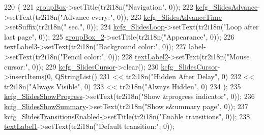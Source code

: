 \begin{DoxyCode}
220     \{
221         \hyperlink{classUi__DlgPresentationBase_a32e91831bba9e18b1bd040f092d18f7a}{groupBox}->setTitle(tr2i18n(\textcolor{stringliteral}{"Navigation"}, 0));
222         \hyperlink{classUi__DlgPresentationBase_a0c1bde315c60ff1727e7b00df3523775}{kcfg\_SlidesAdvance}->setText(tr2i18n(\textcolor{stringliteral}{"Advance every:"}, 0));
223         \hyperlink{classUi__DlgPresentationBase_aba7f1b1ba7c742636c1f2e306001cb3a}{kcfg\_SlidesAdvanceTime}->setSuffix(tr2i18n(\textcolor{stringliteral}{" sec."}, 0));
224         \hyperlink{classUi__DlgPresentationBase_a4bce7ac09466e7c37491950385741fa5}{kcfg\_SlidesLoop}->setText(tr2i18n(\textcolor{stringliteral}{"Loop after last page"}, 0));
225         \hyperlink{classUi__DlgPresentationBase_a74ff79cdf30be7fcd1d8a52488d14bbf}{groupBox\_2}->setTitle(tr2i18n(\textcolor{stringliteral}{"Appearance"}, 0));
226         \hyperlink{classUi__DlgPresentationBase_ae5ef2f22ad09c5290e989c3979c7009f}{textLabel3}->setText(tr2i18n(\textcolor{stringliteral}{"Background color:"}, 0));
227         \hyperlink{classUi__DlgPresentationBase_ae5123efd7c909bb49d9f9e1252f807e0}{label}->setText(tr2i18n(\textcolor{stringliteral}{"Pencil color:"}, 0));
228         \hyperlink{classUi__DlgPresentationBase_acbcb684cbb6019f342e3915f13e88dd7}{textLabel2}->setText(tr2i18n(\textcolor{stringliteral}{"Mouse cursor:"}, 0));
229         \hyperlink{classUi__DlgPresentationBase_a63fb3704d0688c48101de850dc997a52}{kcfg\_SlidesCursor}->clear();
230         \hyperlink{classUi__DlgPresentationBase_a63fb3704d0688c48101de850dc997a52}{kcfg\_SlidesCursor}->insertItems(0, QStringList()
231          << tr2i18n(\textcolor{stringliteral}{"Hidden After Delay"}, 0)
232          << tr2i18n(\textcolor{stringliteral}{"Always Visible"}, 0)
233          << tr2i18n(\textcolor{stringliteral}{"Always Hidden"}, 0)
234         );
235         \hyperlink{classUi__DlgPresentationBase_a49775134ab9e76d0159e100bbe9f7cc3}{kcfg\_SlidesShowProgress}->setText(tr2i18n(\textcolor{stringliteral}{"Show &progress indicator"}, 0));
236         \hyperlink{classUi__DlgPresentationBase_aaa52dec18529c711c073a72fa10ac18e}{kcfg\_SlidesShowSummary}->setText(tr2i18n(\textcolor{stringliteral}{"Show s&ummary page"}, 0));
237         \hyperlink{classUi__DlgPresentationBase_a489f5852bca9a8fa374373464e6471c5}{kcfg\_SlidesTransitionsEnabled}->setTitle(tr2i18n(\textcolor{stringliteral}{"Enable transitions"}, 
      0));
238         \hyperlink{classUi__DlgPresentationBase_a378f091644c96cc7d40ea73433402362}{textLabel1}->setText(tr2i18n(\textcolor{stringliteral}{"Default transition:"}, 0));

\end{DoxyCode}
